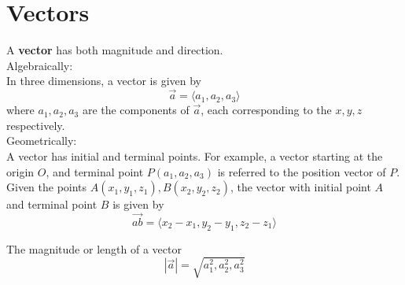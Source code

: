 \documentclass[twoside]{report}
\begin{document}
    \section{Vectors}
    \begin{definition}[Vectors]
        A \textbf{vector} has both magnitude and direction.\\
        Algebraically:\\
        In three dimensions, a vector is given by
        \begin{equation}
            \vec{a} = \langle a_{1}, a_{2}, a_{3}\rangle
        \end{equation}
        where $a_{1}, a_{2}, a_{3}$ are the components of $\vec{a}$, each corresponding to the $x, y, z$ respectively.\\
        Geometrically:\\
        A vector has initial and terminal points. For example, a vector starting at the origin $O$, and terminal point $P(a_{1}, a_{2}, a_{3})$ is referred to the position vector of $P$.\\
        Given the points $A(x_{1}, y_{1}, z_{1}), B(x_{2}, y_{2}, z_{2})$, the vector with initial point $A$ and terminal point $B$ is given by
        \begin{equation}
            \vec{ab} = \langle x_{2} - x_{1}, y_{2} - y_{1}, z_{2} - z_{1}\rangle
        \end{equation}
    \end{definition}
    \begin{definition}[Magnitude]
        The magnitude or length of a vector
        \begin{equation}
            |\vec{a}| = \sqrt{a_{1}^{2}, a_{2}^{2}, a_{3}^{2}}
        \end{equation}
    \end{definition}
\end{document}
